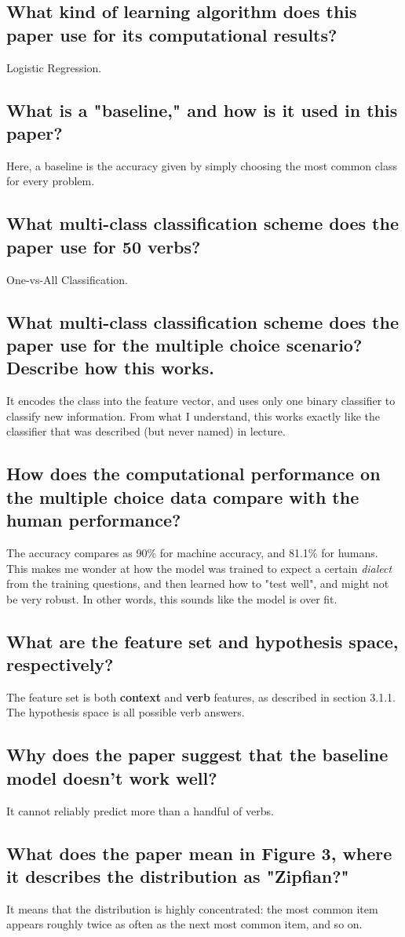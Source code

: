 \documentclass{article}
\begin{document}
\subsection{What kind of learning algorithm does this paper use for its computational results?}
Logistic Regression.

\subsection{What is a "baseline," and how is it used in this paper?}
Here, a baseline is the accuracy given by simply choosing the most common class for every problem. 

\subsection{What multi-class classification scheme does the paper use for 50 verbs?}
One-vs-All Classification.

\subsection{What multi-class classification scheme does the paper use for the multiple choice scenario? Describe how this works.}
It encodes the class into the feature vector, and uses only one binary classifier to classify new information. From what I understand, this works exactly like the classifier that was described (but never named) in lecture. 

\subsection{How does the computational performance on the multiple choice data compare with the human performance?}
The accuracy compares as 90\% for machine accuracy, and 81.1\% for humans. This makes me wonder at how the model was trained to expect a certain \textit{dialect} from the training questions, and then learned how to "test well", and might not be very robust. In other words, this sounds like the model is over fit. 

\subsection{What are the feature set and hypothesis space, respectively?}
The feature set is both \textbf{context} and \textbf{verb} features, as described in section 3.1.1. The hypothesis space is all possible verb answers. 

\subsection{Why does the paper suggest that the baseline model doesn't work well?}
It cannot reliably predict more than a handful of verbs. 

\subsection{What does the paper mean in Figure 3, where it describes the distribution as "Zipfian?"}
It means that the distribution is highly concentrated: the most common item appears roughly twice as often as the next most common item, and so on. 
\end{document}
